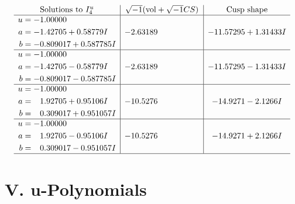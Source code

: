 \documentclass[1p]{elsarticle_modified}
\theoremstyle{definition}
\newcommand{\I}{\sqrt{-1}}
\begin{document}
$$\begin{array}{c|c|c}  
\text{Solutions to }I^u_{4}& \I (\text{vol} + \sqrt{-1}CS) & \text{Cusp shape}\\
 \hline 
\begin{aligned}
u &= -1.00000\phantom{ +0.000000I} \\
a &= -1.42705 + 0.58779 I \\
b &= -0.809017 + 0.587785 I\end{aligned}
 & -2.63189\phantom{ +0.000000I} & -11.57295 + 1.31433 I \\ \hline\begin{aligned}
u &= -1.00000\phantom{ +0.000000I} \\
a &= -1.42705 - 0.58779 I \\
b &= -0.809017 - 0.587785 I\end{aligned}
 & -2.63189\phantom{ +0.000000I} & -11.57295 - 1.31433 I \\ \hline\begin{aligned}
u &= -1.00000\phantom{ +0.000000I} \\
a &= \phantom{-}1.92705 + 0.95106 I \\
b &= \phantom{-}0.309017 + 0.951057 I\end{aligned}
 & -10.5276\phantom{ +0.000000I} & -14.9271 - 2.1266 I \\ \hline\begin{aligned}
u &= -1.00000\phantom{ +0.000000I} \\
a &= \phantom{-}1.92705 - 0.95106 I \\
b &= \phantom{-}0.309017 - 0.951057 I\end{aligned}
 & -10.5276\phantom{ +0.000000I} & -14.9271 + 2.1266 I\\
 \hline 
 \end{array}$$\newpage
\newpage\renewcommand{\arraystretch}{1}
\centering \section*{ V. u-Polynomials}
\end{document}
